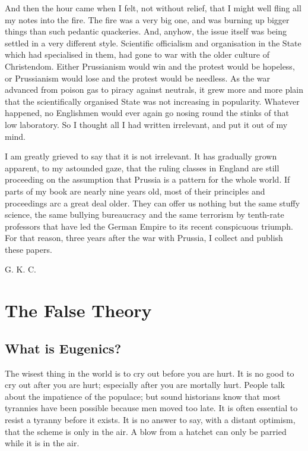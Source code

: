 \documentclass{book}
\begin{document}
And then the hour came when I felt, not without relief, that I might well fling all my notes into the fire. The fire was a very big one, and was burning up bigger things than such pedantic quackeries. And, anyhow, the issue itself was being settled in a very different style. Scientific officialism and organisation in the State which had specialised in them, had gone to war with the older culture of Christendom. Either Prussianism would win and the protest would be hopeless, or Prussianism would lose and the protest would be needless. As the war advanced from poison gas to piracy against neutrals, it grew more and more plain that the scientifically organised State was not increasing in popularity. Whatever happened, no Englishmen would ever again go nosing round the stinks of that low laboratory. So I thought all I had written irrelevant, and put it out of my mind.

I am greatly grieved to say that it is not irrelevant. It has gradually grown apparent, to my astounded gaze, that the ruling classes in England are still proceeding on the assumption that Prussia is a pattern for the whole world. If parts of my book are nearly nine years old, most of their principles and proceedings arc a great deal older. They can offer us nothing but the same stuffy science, the same bullying bureaucracy and the same terrorism by tenth-rate professors that have led the German Empire to its recent conspicuous triumph. For that reason, three years after the war with Prussia, I collect and publish these papers.

G. K. C.

\setcounter{chapter}{0}\part{The False Theory}
\label{chapter-1}
\chapter{What is Eugenics?}
\label{chapter-2}
The wisest thing in the world is to cry out before you are hurt. It is no good to cry out after you are hurt; especially after you are mortally hurt. People talk about the impatience of the populace; but sound historians know that most tyrannies have been possible because men moved too late. It is often essential to resist a tyranny before it exists. It is no answer to say, with a distant optimism, that the scheme is only in the air. A blow from a hatchet can only be parried while it is in the air.
\end{document}
